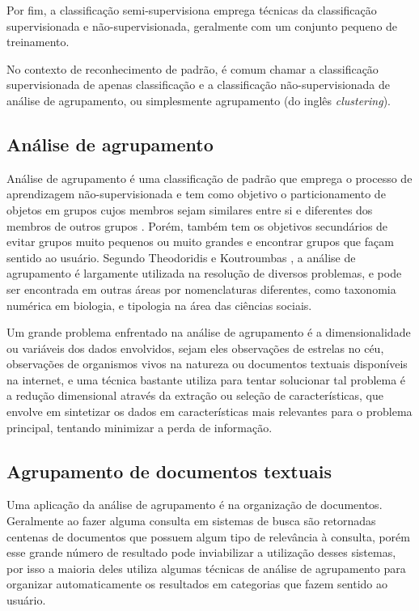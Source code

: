 \documentclass[a4paper,12pt]{article}
\begin{document}
Por fim, a classificação semi-supervisiona emprega técnicas da classificação supervisionada e não-supervisionada, geralmente com um conjunto pequeno de treinamento.

No contexto de reconhecimento de padrão, é comum chamar a classificação supervisionada de apenas classificação e a classificação não-supervisionada de análise de agrupamento, ou simplesmente agrupamento (do inglês \textit{clustering}). 



\subsection{Análise de agrupamento}
\label{sec:analise_agrupamento}

Análise de agrupamento é uma classificação de padrão que emprega o processo de aprendizagem não-supervisionada e tem como objetivo o particionamento de objetos em grupos cujos membros sejam similares entre si e diferentes dos membros de outros grupos \cite{Jain99}. Porém, também tem os objetivos secundários de evitar grupos muito pequenos ou muito grandes e encontrar grupos que façam sentido ao usuário. Segundo Theodoridis e Koutroumbas \cite{Koutroumbas06}, a análise de agrupamento é largamente utilizada na resolução de diversos problemas, e pode ser encontrada em outras áreas por nomenclaturas diferentes, como taxonomia numérica em biologia, e tipologia na área das ciências sociais.

Um grande problema enfrentado na análise de agrupamento é a dimensionalidade ou variáveis dos dados envolvidos, sejam eles observações de estrelas no céu, observações de organismos vivos na natureza ou documentos textuais disponíveis na internet, e uma técnica bastante utiliza para tentar solucionar tal problema é a redução dimensional através da extração ou seleção de características, que envolve em sintetizar os dados em características mais relevantes para o problema principal, tentando minimizar a perda de informação.

\subsection{Agrupamento de documentos textuais}
\label{sec:agrupamento_doc_textual}

Uma aplicação da análise de agrupamento é na organização de documentos. Geralmente ao fazer alguma consulta em sistemas de busca são retornadas centenas de documentos que possuem algum tipo de relevância à consulta, porém esse grande número de resultado pode inviabilizar a utilização desses sistemas, por isso a maioria deles utiliza algumas técnicas de análise de agrupamento para organizar automaticamente os resultados em categorias que fazem sentido ao usuário. 
\end{document}
